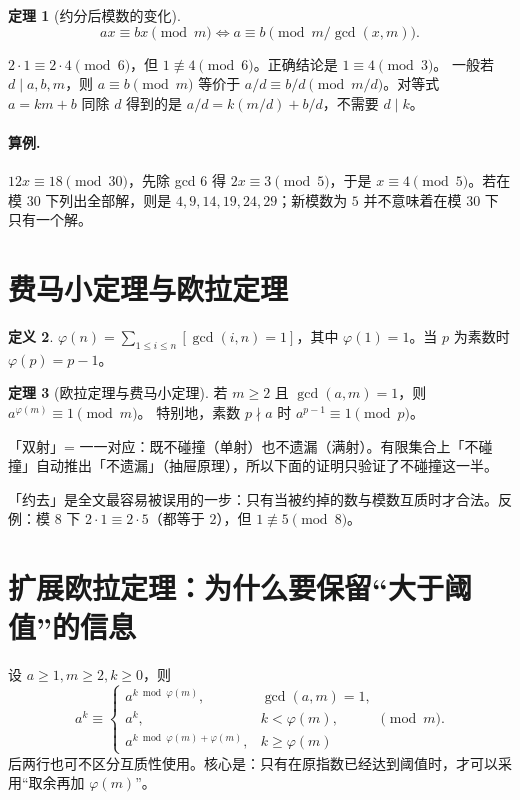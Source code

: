 \documentclass[UTF8,a4paper,11pt,twoside,openright,fontset=fandol]{ctexbook}
\theoremstyle{definition}
\newtheorem{definition}{定义}[chapter]
\newtheorem{theorem}[definition]{定理}
\newcommand{\iva}[1]{\left[#1\right]}
\begin{document}
\begin{theorem}[约分后模数的变化]
\[
 ax\equiv bx\pmod m
 \iff a\equiv b\pmod{m/\gcd(x,m)}.
\]
\end{theorem}
\begin{pitfall}[把整数除法直接搬到同余式中会出错]
$2\cdot1\equiv2\cdot4\pmod6$，但 $1\not\equiv4\pmod6$。正确结论是 $1\equiv4\pmod3$。
一般若 $d\mid a,b,m$，则 $a\equiv b\pmod m$ 等价于 $a/d\equiv b/d\pmod{m/d}$。对等式 $a=km+b$ 同除 $d$ 得到的是 $a/d=k(m/d)+b/d$，不需要 $d\mid k$。
\end{pitfall}
\paragraph{算例.} $12x\equiv18\pmod{30}$，先除 gcd $6$ 得 $2x\equiv3\pmod5$，于是 $x\equiv4\pmod5$。若在模 $30$ 下列出全部解，则是 $4,9,14,19,24,29$；新模数为 $5$ 并不意味着在模 $30$ 下只有一个解。


\section{费马小定理与欧拉定理}
\begin{definition}
$\varphi(n)=\sum_{1\le i\le n}\iva{\gcd(i,n)=1}$，其中 $\varphi(1)=1$。当 $p$ 为素数时 $\varphi(p)=p-1$。
\end{definition}
\begin{theorem}[欧拉定理与费马小定理]
若 $m\ge2$ 且 $\gcd(a,m)=1$，则 $a^{\varphi(m)}\equiv1\pmod m$。
特别地，素数 $p\nmid a$ 时 $a^{p-1}\equiv1\pmod p$。
\end{theorem}
\begin{tip}[词义：双射（这里为何只验一半）]
「双射」= 一一对应：既不碰撞（单射）也不遗漏（满射）。有限集合上「不碰撞」自动推出「不遗漏」（抽屉原理），所以下面的证明只验证了不碰撞这一半。
\end{tip}

\begin{tip}[小心：约去必须互质]
「约去」是全文最容易被误用的一步：只有当被约掉的数与模数互质时才合法。反例：模 $8$ 下 $2\cdot1\equiv2\cdot5$（都等于 $2$），但 $1\not\equiv5\pmod 8$。
\end{tip}


\section{扩展欧拉定理：为什么要保留“大于阈值”的信息}
设 $a\ge1,m\ge2,k\ge0$，则
\[
 a^k\equiv
 \begin{cases}
 a^{k\bmod\varphi(m)},&\gcd(a,m)=1,\\
 a^k,&k<\varphi(m),\\
 a^{k\bmod\varphi(m)+\varphi(m)},&k\ge\varphi(m)
 \end{cases}\pmod m.
\]
后两行也可不区分互质性使用。核心是：只有在原指数已经达到阈值时，才可以采用“取余再加 $\varphi(m)$”。
\end{document}
